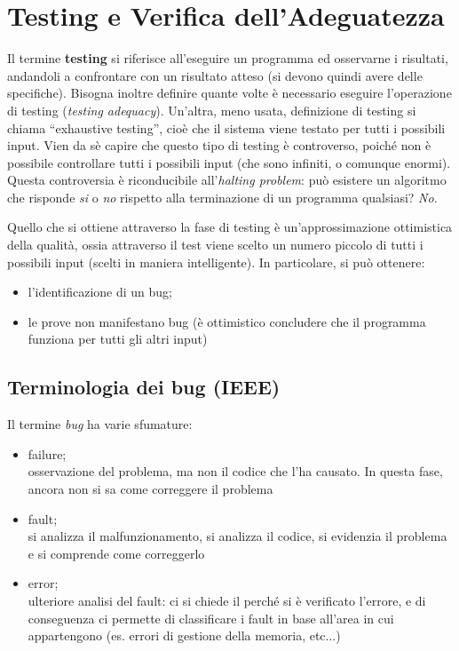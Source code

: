 \section{Testing e Verifica dell'Adeguatezza}

Il termine \textbf{testing} si riferisce all'eseguire un programma ed osservarne i risultati, andandoli a confrontare con un risultato atteso (si devono quindi avere delle specifiche). Bisogna inoltre definire quante volte è necessario eseguire l'operazione di testing (\textit{testing adequacy}). Un'altra, meno usata, definizione di testing si chiama ``exhaustive testing'', cioè che il sistema viene testato per tutti i possibili input. Vien da sè capire che questo tipo di testing è controverso, poiché non è possibile controllare tutti i possibili input (che sono infiniti, o comunque enormi). Questa controversia è riconducibile all'\textit{halting problem}: può esistere un algoritmo che risponde \textit{si} o \textit{no} rispetto alla terminazione di un programma qualsiasi? \textit{No}.

Quello che si ottiene attraverso la fase di testing è un'approssimazione ottimistica della qualità, ossia attraverso il test viene scelto un numero piccolo di tutti i possibili input (scelti in maniera intelligente). In particolare, si può ottenere: \begin{itemize}
    \item l'identificazione di un bug;
    \item le prove non manifestano bug (è ottimistico concludere che il programma funziona per tutti gli altri input)
\end{itemize}

\subsection{Terminologia dei bug (IEEE)}

Il termine \textit{bug} ha varie sfumature: \begin{itemize}
    \item failure; \\ osservazione del problema, ma non il codice che l'ha causato. In questa fase, ancora non si sa come correggere il problema
    \item fault; \\ si analizza il malfunzionamento, si analizza il codice, si evidenzia il problema e si comprende come correggerlo
    \item error; \\ ulteriore analisi del fault: ci si chiede il perché si è verificato l'errore, e di conseguenza ci permette di classificare i fault in base all'area in cui appartengono (es. errori di gestione della memoria, etc...)
\end{itemize}

